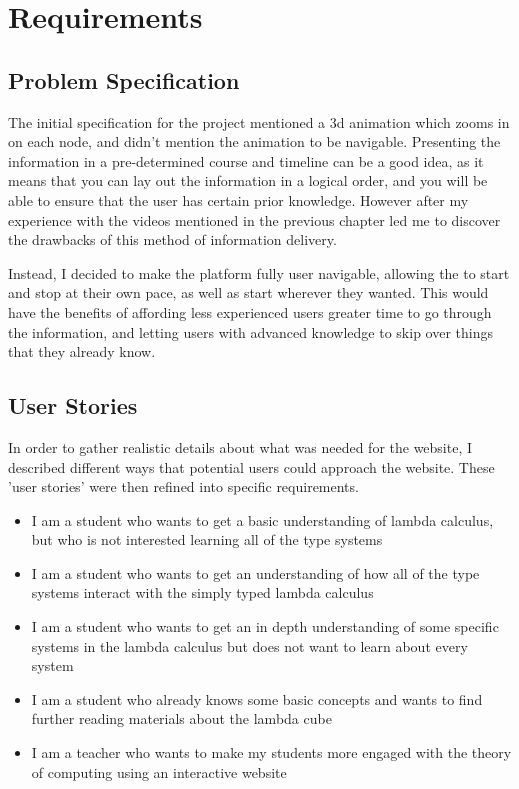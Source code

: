 \documentclass{l4proj}
\begin{document}
\chapter{Requirements}

\section{Problem Specification}
The initial specification for the project mentioned a 3d animation which zooms in on each node, and didn't mention the animation to be navigable.  Presenting the information in a pre-determined course and timeline can be a good idea, as it means that you can lay out the information in a logical order, and you will be able to ensure that the user has certain prior knowledge.  However after my experience with the videos mentioned in the previous chapter led me to discover the drawbacks of this method of information delivery.

Instead, I decided to make the platform fully user navigable, allowing the to start and stop at their own pace, as well as start wherever they wanted.  This would have the benefits of affording less experienced users greater time to go through the information, and letting users with advanced knowledge to skip over things that they already know.

\section{User Stories}
In order to gather realistic details about what was needed for the website, I described different ways that potential users could approach the website.  These 'user stories' were then refined into specific requirements.

\begin{itemize}
    \item 
        I am a student who wants to get a basic understanding of lambda calculus, but who is not interested learning all of the type systems

    \item
        I am a student who wants to get an understanding of how all of the type systems interact with the simply typed lambda calculus

    \item
        I am a student who wants to get an in depth understanding of some specific systems in the lambda calculus but does not want to learn about every system

    \item
        I am a student who already knows some basic concepts and wants to find further reading materials about the lambda cube
    \item 
        I am a teacher who wants to make my students more engaged with the theory of computing using an interactive website
\end{itemize}
\end{document}
